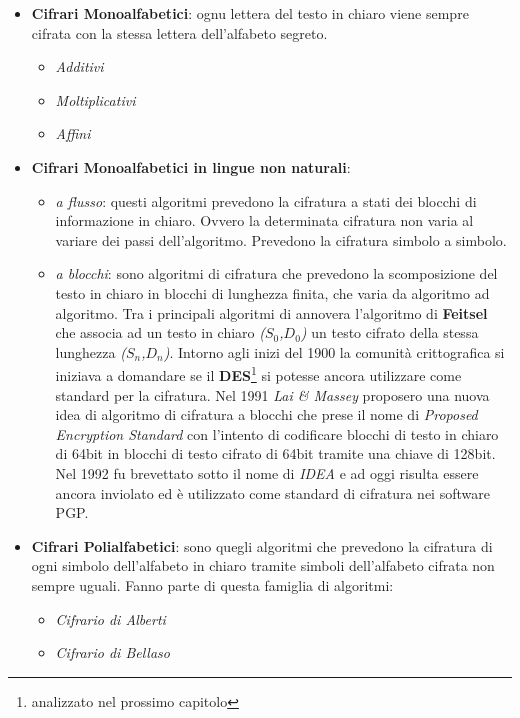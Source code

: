 \documentclass[11pt, a4paper, oneside]{Thesis} %
\begin{document}
\begin{itemize}
 \item \textbf{Cifrari Monoalfabetici}: ognu lettera del testo in chiaro viene sempre cifrata con la stessa lettera dell'alfabeto segreto.
 \begin{itemize}
 \item \textit{Additivi}
 \item \textit{Moltiplicativi}
 \item \textit{Affini}
 \end{itemize}
 \item \textbf{Cifrari Monoalfabetici in lingue non naturali}:
 \begin{itemize}
  \item \textit{a flusso}: questi algoritmi prevedono la cifratura a stati dei blocchi di informazione in chiaro. Ovvero la determinata cifratura non varia al variare dei passi dell'algoritmo.
  Prevedono la cifratura simbolo a simbolo.
  \item \textit{a blocchi}: sono algoritmi di cifratura che prevedono la scomposizione del testo in chiaro in blocchi di lunghezza finita, che varia da algoritmo ad algoritmo. Tra i
  principali algoritmi di annovera l'algoritmo di \textbf{Feitsel} che associa ad un testo in chiaro \textit{($S_0$,$D_0$)} un testo cifrato della stessa lunghezza 
  \textit{($S_n$,$D_n$)}. Intorno agli inizi del 1900 la comunità crittografica si iniziava a domandare se il \textbf{DES}\footnote{analizzato nel prossimo capitolo} si potesse ancora 
  utilizzare come standard per la cifratura. Nel 1991 \emph{Lai \& Massey} proposero una nuova idea di algoritmo di cifratura a blocchi che prese il nome di \textit{Proposed Encryption Standard}
  con l'intento di codificare blocchi di testo in chiaro di 64bit in blocchi di testo cifrato di 64bit tramite una chiave di 128bit. Nel 1992 fu brevettato sotto il nome di \textit{IDEA} e ad oggi
  risulta essere ancora inviolato ed è utilizzato come standard di cifratura nei software PGP.
 \end{itemize}
 \item \textbf{Cifrari Polialfabetici}: sono quegli algoritmi che prevedono la cifratura di ogni simbolo dell'alfabeto in chiaro tramite simboli dell'alfabeto cifrata non sempre uguali.
 Fanno parte di questa famiglia di algoritmi:
 \begin{itemize}
  \item \textit{Cifrario di Alberti}
  \item \textit{Cifrario di Bellaso}
 \end{itemize}
\end{itemize}
\end{document}
